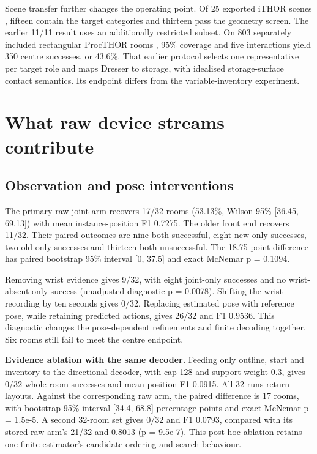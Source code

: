 \documentclass[10pt,twocolumn,letterpaper]{article}
\begin{document}
Scene transfer further changes the operating point. Of 25 exported iTHOR
scenes \cite{r7}, fifteen contain the target categories and thirteen
pass the geometry screen. The earlier 11/11 result uses an additionally
restricted subset. On 803 separately included rectangular ProcTHOR rooms
\cite{r8}, 95\% coverage and five interactions yield 350 centre
successes, or 43.6\%. That earlier protocol selects one representative
per target role and maps Dresser to storage, with idealised
storage-surface contact semantics. Its endpoint differs from the
variable-inventory experiment.

\section{What raw device streams
contribute}\label{what-raw-device-streams-contribute}

\subsection{Observation and pose
interventions}\label{observation-and-pose-interventions}

The primary raw joint arm recovers 17/32 rooms (53.13\%, Wilson 95\%
{[}36.45, 69.13{]}) with mean instance-position F1 0.7275. The older
front end recovers 11/32. Their paired outcomes are nine both
successful, eight new-only successes, two old-only successes and
thirteen both unsuccessful. The 18.75-point difference has paired
bootstrap 95\% interval {[}0, 37.5{]} and exact McNemar p = 0.1094.

Removing wrist evidence gives 9/32, with eight joint-only successes and
no wrist-absent-only success (unadjusted diagnostic p = 0.0078).
Shifting the wrist recording by ten seconds gives 0/32. Replacing
estimated pose with reference pose, while retaining predicted actions,
gives 26/32 and F1 0.9536. This diagnostic changes the pose-dependent
refinements and finite decoding together. Six rooms still fail to meet
the centre endpoint.

\textbf{Evidence ablation with the same decoder.} Feeding only outline,
start and inventory to the directional decoder, with cap 128 and support
weight 0.3, gives 0/32 whole-room successes and mean position F1 0.0915.
All 32 runs return layouts. Against the corresponding raw arm, the
paired difference is 17 rooms, with bootstrap 95\% interval {[}34.4,
68.8{]} percentage points and exact McNemar p = 1.5e-5. A second 32-room
set gives 0/32 and F1 0.0793, compared with its stored raw arm's 21/32
and 0.8013 (p = 9.5e-7). This post-hoc ablation retains one finite
estimator's candidate ordering and search behaviour.
\end{document}
